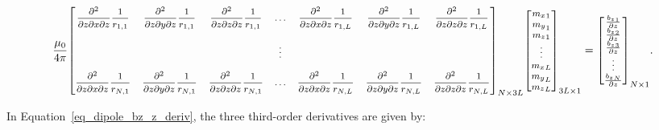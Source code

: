 \begin{equation}
\footnotesize
\label{eq_dipole_bz_z_deriv}
\dfrac{\mu_0}{4\pi}
{\begin{bmatrix}
\dfrac{\partial^2}{\partial z \partial x \partial z} \dfrac{1}{r_{1,1}}
& \dfrac{\partial^2}{\partial z \partial y \partial z} \dfrac{1}{r_{1,1}}
& \dfrac{\partial^2}{\partial z \partial z \partial z} \dfrac{1}{r_{1,1}}
& \hdots
& \dfrac{\partial^2}{\partial z \partial x \partial z} \dfrac{1}{r_{1,L}}
& \dfrac{\partial^2}{\partial z \partial y \partial z} \dfrac{1}{r_{1,L}}
& \dfrac{\partial^2}{\partial z \partial z \partial z} \dfrac{1}{r_{1,L}} \\
\\

& 
& 
& \vdots
& 
& 
&  \\
\\
\dfrac{\partial^2}{\partial z \partial x \partial z} \dfrac{1}{r_{N,1}}
& \dfrac{\partial^2}{\partial z \partial y \partial z} \dfrac{1}{r_{N,1}}
& \dfrac{\partial^2}{\partial z \partial z \partial z} \dfrac{1}{r_{N,1}}
& \hdots
& \dfrac{\partial^2}{\partial z \partial x \partial z} \dfrac{1}{r_{N,L}}
& \dfrac{\partial^2}{\partial z \partial y \partial z} \dfrac{1}{r_{N,L}}
& \dfrac{\partial^2}{\partial z \partial z \partial z} \dfrac{1}{r_{N,L}} \\
\end{bmatrix}}_{N \times 3L}
{\begin{bmatrix}
{m_x}_1 \\ {m_y}_1 \\ {m_z}_1 \\ \vdots \\{m_x}_L \\ {m_y}_L \\ {m_z}_L \\
\end{bmatrix}}_{3L \times 1}
=
{\begin{bmatrix}
\frac{{b_z}_1}{ \partial z} \\ \frac{{b_z}_2}{ \partial z} \\ \frac{{b_z}_3}{ \partial z} \\ \vdots \\\frac{{b_z}_N}{ \partial z}
\end{bmatrix}}_{N \times 1}.
\end{equation} \bigskip

In Equation~\ref{eq_dipole_bz_z_deriv}, the three third-order derivatives are given by:

